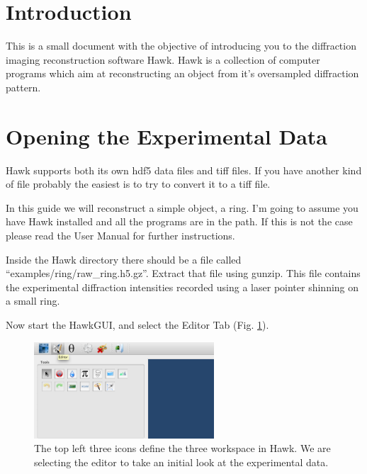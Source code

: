 \documentclass[a4paper]{article}
\begin{document}
\parindent=0pt 
\baselineskip=18pt 
\lineskip=0pt


\pagestyle{headings}

\def\delfo{$\delta_{fo}$~}
\def\delfc{$\delta_{fc}$~}
\def\qq{\qquad\qquad}
\def\hbar{\overline{h}}



\section{Introduction} 
\label{intro}

\vspace {0.1in}

This is a small document with the objective of introducing you to the
diffraction imaging reconstruction software Hawk.
Hawk is a collection of computer programs which aim at reconstructing an object from 
it's oversampled  diffraction pattern.


\section{Opening the Experimental Data}
\label{tutorial}

Hawk supports both its own hdf5 data files and tiff files.
If you have another kind of file probably the easiest is to try to
convert it to a tiff file.

In this guide we will reconstruct a simple object, a ring. I'm going
to assume you have Hawk installed and all the programs are in the path. If
this is not the case please read the User Manual for further
instructions.

Inside the Hawk directory there should be a file called
``examples/ring/raw\_ring.h5.gz''. Extract that file using gunzip.
This file contains the experimental diffraction intensities recorded
using a laser pointer shinning on a small ring.

Now start the HawkGUI, and select the Editor Tab (Fig. \ref{select-editor}).

\begin{figure}[h]
 \centering
 \includegraphics[width=0.6\textwidth]{./select_editor.png}
\caption{The top left three icons define the three workspace in
   Hawk. We are selecting the editor to take an initial look at the
   experimental data.}
 \label{select-editor}   
\end{figure}
\end{document}
